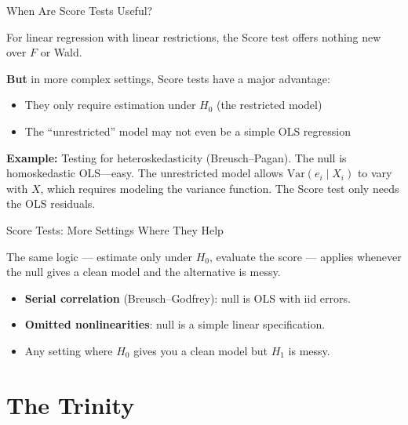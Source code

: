 \documentclass[handout, aspectratio=169]{beamer}
\numberwithin{equation}{section}
\begin{document}
\begin{frame}{When Are Score Tests Useful?}

For linear regression with linear restrictions, the Score test offers nothing new over $F$ or Wald.

\pause
\bigskip

\textbf{But} in more complex settings, Score tests have a major advantage:

\begin{itemize}
\item They only require estimation under $H_0$ (the restricted model)
\item The ``unrestricted'' model may not even be a simple OLS regression
\end{itemize}

\pause
\bigskip

\textbf{Example:} Testing for heteroskedasticity (Breusch--Pagan).  The null is homoskedastic OLS---easy.  The unrestricted model allows $\text{Var}(e_i \mid X_i)$ to vary with $X$, which requires modeling the variance function.  The Score test only needs the OLS residuals.
\end{frame}

\begin{frame}{Score Tests: More Settings Where They Help}

The same logic --- estimate only under $H_0$, evaluate the score --- applies whenever the null gives a clean model and the alternative is messy.

\pause
\bigskip

\begin{itemize}
\item \textbf{Serial correlation} (Breusch--Godfrey): null is OLS with iid errors.
\item \textbf{Omitted nonlinearities}: null is a simple linear specification.
\item Any setting where $H_0$ gives you a clean model but $H_1$ is messy.
\end{itemize}
\end{frame}

\section{The Trinity}
\setcounter{subsection}{1}
\end{document}
